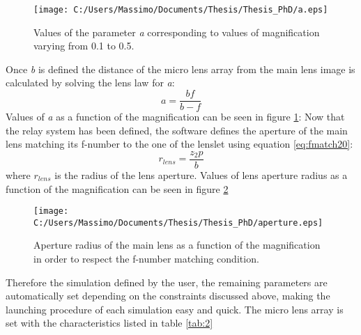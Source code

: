 \begin{figure}[H]
	\centering
	\texttt{[image: C:/Users/Massimo/Documents/Thesis/Thesis\_PhD/a.eps]}
	\caption{\label{fig:a} Values of the parameter \textit{a} corresponding to values of magnification varying from 0.1 to 0.5.}
\end{figure}
Once \textit{b} is defined the distance of the micro lens array from the main lens image is calculated by solving the lens law for \textit{a}:
\begin{equation}
	\label{eq:a}
a = \dfrac{bf}{b-f}
\end{equation} 
Values of \textit{a} as a function of the magnification can be seen in figure \ref{fig:a}:
Now that the relay system has been defined, the software defines the aperture of the main lens matching its f-number to the one of the lenslet using equation \ref{eq:fmatch20}:
\begin{equation}
	\label{eq:radiuslens}
r_{lens} = \dfrac{z_2p}{b}
\end{equation}
where $r_{lens}$ is the radius of the lens aperture.
Values of lens aperture radius as a function of the magnification can be seen in figure \ref{fig:aperture1}
\begin{figure}[H]
	\centering
	\texttt{[image: C:/Users/Massimo/Documents/Thesis/Thesis\_PhD/aperture.eps]}
	\caption{\label{fig:aperture1} Aperture radius of the main lens as a function of the magnification in order to respect the f-number matching condition.}
\end{figure}
Therefore the simulation defined by the user, the remaining parameters are automatically set depending on the constraints discussed above, making the launching procedure of each simulation easy and quick.
The micro lens array is set with the characteristics listed in table \ref{tab:2}\\

